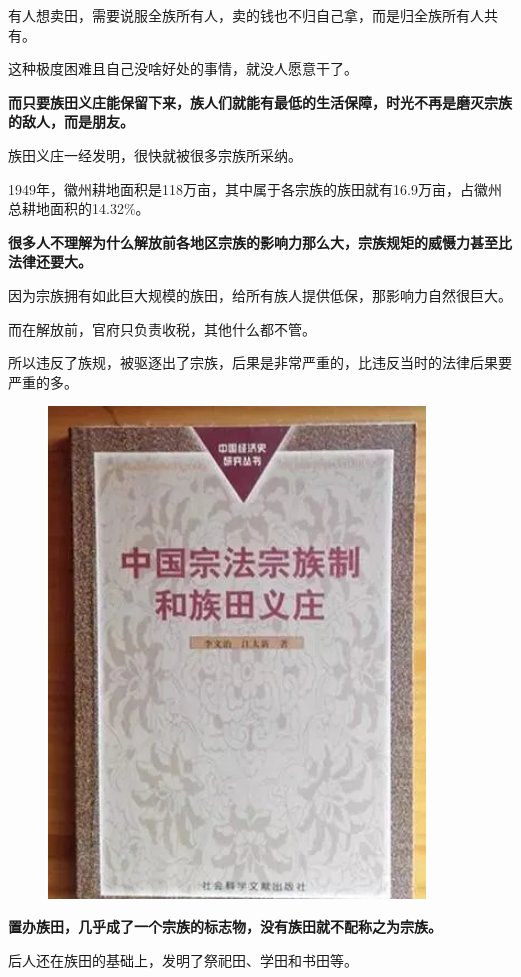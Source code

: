 \documentclass[UTF8, 11pt, oneside]{ctexart}
\newcommand{\zd}[1]{\textbf{\textcolor[RGB]{123,12,0}{#1}}} %
\begin{document}
有人想卖田，需要说服全族所有人，卖的钱也不归自己拿，而是归全族所有人共有。

这种极度困难且自己没啥好处的事情，就没人愿意干了。

\zd{而只要族田义庄能保留下来，族人们就能有最低的生活保障，时光不再是磨灭宗族的敌人，而是朋友。}

族田义庄一经发明，很快就被很多宗族所采纳。

1949年，徽州耕地面积是118万亩，其中属于各宗族的族田就有16.9万亩，占徽州总耕地面积的14.32\%。

\zd{很多人不理解为什么解放前各地区宗族的影响力那么大，宗族规矩的威慑力甚至比法律还要大。}

因为宗族拥有如此巨大规模的族田，给所有族人提供低保，那影响力自然很巨大。

而在解放前，官府只负责收税，其他什么都不管。

所以违反了族规，被驱逐出了宗族，后果是非常严重的，比违反当时的法律后果要严重的多。

\begin{figure}[H]
    \centering
    \includegraphics[width=10cm]{2024-03-20-002}
\end{figure}

\zd{置办族田，几乎成了一个宗族的标志物，没有族田就不配称之为宗族。}

后人还在族田的基础上，发明了祭祀田、学田和书田等。
\end{document}

